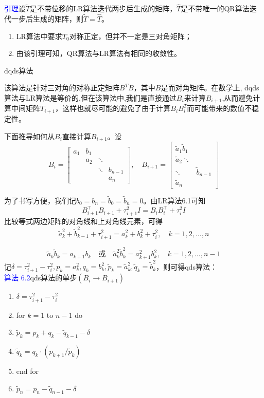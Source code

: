 \documentclass[12pt,a4paper]{article}
\begin{document}
\textcolor{blue}{引理}\quad 设$\tilde{T}$是不带位移的LR算法迭代两步后生成的矩阵，$\hat{T}$是不带唯一的QR算法迭代一步后生成的矩阵，则$\tilde{T}=\hat{T}$。

\begin{enumerate}[(1)]
	\item LR算法中要求$T_0$对称正定，但并不一定是三对角矩阵；
	\item 由该引理可知，QR算法与LR算法有相同的收敛性。
\end{enumerate}
dqds算法

该算法是针对三对角的对称正定矩阵$B^TB$，其中$B$是而对角矩阵。在数学上, dqds算法与LR算法是等价的,但在该算法中,我们是直接通过$B_i$来计算$B_{i+1}$,从而避免计算中间矩阵$T_{i+1}$，这样也就尽可能的避免了由于计算$B_iB_i^T$而可能带来的数值不稳定性。

下面推导如何从$B_i$直接计算$B_{i+1}$。设
$$
B_{i}=\left[\begin{array}{cccc}{a_{1}} & {b_{1}} & {} & {} \\ {} & {a_{2}} & {\ddots} & {} \\ {} & {} & {\ddots} & {b_{n-1}} \\ {} & {} & {} & {a_{n}}\end{array}\right], \quad B_{i+1}=\left[\begin{array}{cccc}{\tilde{a}_{1} \tilde{b}_{1}} \\ {\tilde{a}_{2} \ddots} \\ {\ddots} & {\tilde{b}_{n-1}} \\ {\tilde{a}_{n}}\end{array}\right]
$$

为了书写方便，我们记$b_{0}=b_{n}=\tilde{b}_{0}=\tilde{b}_{n}=0$。由LR算法6.1可知
$$
B_{i+1}^{\top} B_{i+1}+\tau_{i+1}^{2} I=B_{i} B_{i}^{\top}+\tau_{i}^{2} I
$$
比较等式两边矩阵的对角线和上对角线元素，可得
$$
\tilde{a}_{k}^{2}+\tilde{b}_{k-1}^{2}+\tau_{i+1}^{2}=a_{k}^{2}+b_{k}^{2}+\tau_{i}^{2}, \quad k=1,2, \ldots, n
$$

$$
\tilde{a}_{k} \tilde{b}_{k}=a_{k+1} b_{k} \quad \text {或} \quad \tilde{a}_{k}^{2} \tilde{b}_{k}^{2}=a_{k+1}^{2} b_{k}^{2}, \quad k=1,2, \ldots, n-1
$$
记$\delta=\tau_{i+1}^{2}-\tau_{i}^{2}, p_{k}=a_{k}^{2}, q_{k}=b_{k}^{2}, \tilde{p}_{k}=\tilde{a}_{k}^{2}, \tilde{q}_{k}=\tilde{b}_{k}^{2}$，则可得qds算法：\\
\textcolor{blue}{算法 6.2}\quad qds算法的单步$\left(B_{i} \rightarrow B_{i+1}\right)$
\begin{enumerate}[1:]
	\item $\delta=\tau_{i+1}^{2}-\tau_{i}^{2}$
	\item for $k=1$ to $n-1$ do
	\item \quad $\tilde{p}_{k}=p_{k}+q_{k}-\tilde{q}_{k-1}-\delta$
	\item $\tilde{q}_{k}=q_{k} \cdot\left(p_{k+1} / \tilde{p}_{k}\right)$
	\item end for 
	\item $\tilde{p}_{n}=p_{n}-\tilde{q}_{n-1}-\delta$
\end{enumerate}
\end{document}
